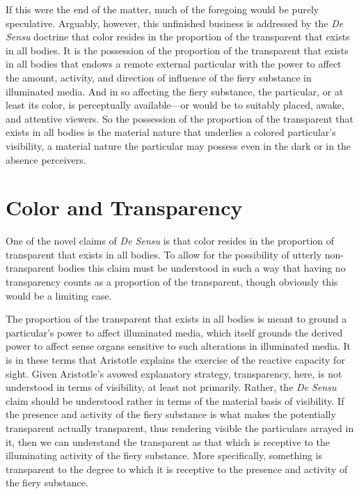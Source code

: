 If this were the end of the matter, much of the foregoing would be purely speculative. Arguably, however, this unfinished business is addressed by the \emph{De Sensu} doctrine that color resides in the proportion of the transparent that exists in all bodies. It is the possession of the proportion of the transparent that exists in all bodies that endows a remote external particular with the power to affect the amount, activity, and direction of influence of the fiery substance in illuminated media. And in so affecting the fiery substance, the particular, or at least its color, is perceptually available---or would be to suitably placed, awake, and attentive viewers. So the possession of the proportion of the transparent that exists in all bodies is the material nature that underlies a colored particular's visibility, a material nature the particular may possess even in the dark or in the absence perceivers.


\section{Color and Transparency} %
\label{sec:color_and_transparency}

One of the novel claims of \emph{De Sensu} is that color resides in the proportion of transparent that exists in all bodies. To allow for the possibility of utterly non-transparent bodies this claim must be understood in such a way that having no transparency counts as a proportion of the transparent, though obviously this would be a limiting case. 

The proportion of the transparent that exists in all bodies is meant to ground a particular's power to affect illuminated media, which itself grounds the derived power to affect sense organs sensitive to such alterations in illuminated media. It is in these terms that Aristotle explains the exercise of the reactive capacity for sight. Given Aristotle's avowed explanatory strategy, transparency, here, is not understood in terms of visibility, at least not primarily. Rather, the \emph{De Sensu} claim should be understood rather in terms of the material basis of visibility. If the presence and activity of the fiery substance is what makes the potentially transparent actually transparent, thus rendering visible the particulars arrayed in it, then we can understand the transparent as that which is receptive to the illuminating activity of the fiery substance. More specifically, something is transparent to the degree to which it is receptive to the presence and activity of the fiery substance. 

